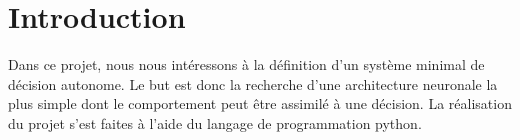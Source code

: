 \section{Introduction}

Dans ce projet, nous nous intéressons à la définition d'un système minimal de décision autonome.
Le but est donc la recherche d'une architecture neuronale la plus simple dont le comportement peut être assimilé à une décision.
La réalisation du projet s'est faites à l'aide du langage de programmation python.


